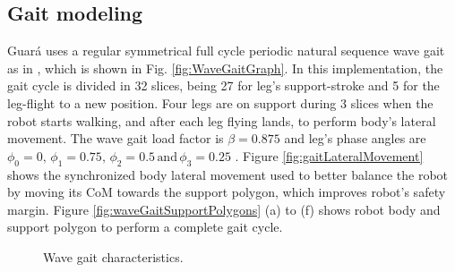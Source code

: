 \subsection{Gait modeling}
\label{subs:gaitModeling}
Guar\'a uses a regular symmetrical full cycle periodic natural sequence wave gait as in \cite{song_machines_1989}, which is shown in Fig. \ref{fig:WaveGaitGraph}. In this implementation, the gait cycle is divided in 32 slices, being 27 for leg's support-stroke and 5 for the leg-flight to a new position. Four legs are on support during 3 slices when the robot starts walking, and after each leg flying lands, to perform body's lateral movement. The wave gait load factor is $\beta=0.875$ and leg's phase angles are $\phi_0=0,\,\phi_1=0.75,\,\phi_2=0.5\,\text{and}\,\phi_3=0.25$ \cite{bento_filho_modeling_2007}. Figure \ref{fig:gaitLateralMovement} shows the synchronized body lateral movement used to better balance the robot by moving its CoM towards the support polygon, which improves robot's safety margin. Figure \ref{fig:waveGaitSupportPolygons} (a) to (f) shows robot body and support polygon to perform a complete gait cycle.
\begin{figure}[h]
	\centering
	\caption{Wave gait characteristics.}
\end{figure}
